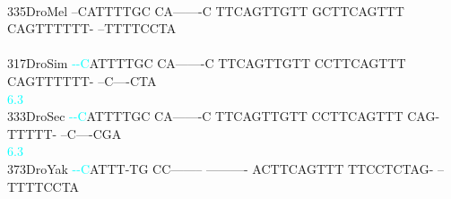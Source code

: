 \documentclass[11pt,twoside,reqno,a4paper]{article}
\begin{document}
{\\
335\hspace*{1\charwidth}DroMel	--CATTTTGC	CA-------C	TTCAGTTGTT	GCTTCAGTTT	CAGTTTTTT-	--TTTTCCTA	\\
\hspace*{4\charwidth}\hspace*{7\charwidth}\hspace*{1\charwidth}\hspace*{1\charwidth}\hspace*{1\charwidth}\hspace*{1\charwidth}\hspace*{1\charwidth}\hspace*{1\charwidth}\\
317\hspace*{1\charwidth}DroSim	\textcolor{cyan}{-}\textcolor{cyan}{-}\textcolor{cyan}{C}ATTTTGC	CA-------C	TTCAGTTGTT	CCTTCAGTTT	CAGTTTTTT-	--C----CTA	\\
\hspace*{4\charwidth}\hspace*{7\charwidth}\hspace*{0\charwidth}\textcolor{cyan}{6.3}\hspace*{1\charwidth}\hspace*{1\charwidth}\hspace*{1\charwidth}\hspace*{1\charwidth}\hspace*{1\charwidth}\hspace*{1\charwidth}\\
333\hspace*{1\charwidth}DroSec	\textcolor{cyan}{-}\textcolor{cyan}{-}\textcolor{cyan}{C}ATTTTGC	CA-------C	TTCAGTTGTT	CCTTCAGTTT	CAG-TTTTT-	--C----CGA	\\
\hspace*{4\charwidth}\hspace*{7\charwidth}\hspace*{0\charwidth}\textcolor{cyan}{6.3}\hspace*{1\charwidth}\hspace*{1\charwidth}\hspace*{1\charwidth}\hspace*{1\charwidth}\hspace*{1\charwidth}\hspace*{1\charwidth}\\
373\hspace*{1\charwidth}DroYak	\textcolor{cyan}{-}\textcolor{cyan}{-}\textcolor{cyan}{C}ATTT-TG	CC--------	----------	ACTTCAGTTT	TTCCTCTAG-	--TTTTCCTA	\\
}
\end{document}

